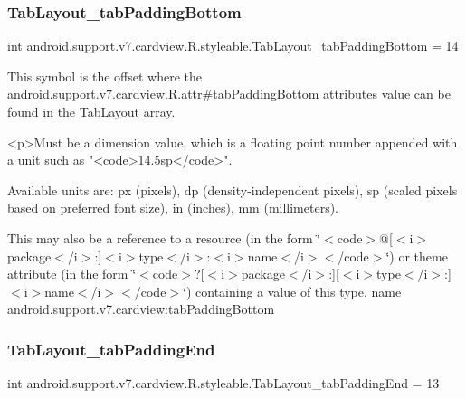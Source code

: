 \subsubsection{\texorpdfstring{Tab\+Layout\+\_\+tab\+Padding\+Bottom}{TabLayout\_tabPaddingBottom}}
{\footnotesize\ttfamily int android.\+support.\+v7.\+cardview.\+R.\+styleable.\+Tab\+Layout\+\_\+tab\+Padding\+Bottom = 14\hspace{0.3cm}{\ttfamily [static]}}

This symbol is the offset where the \hyperlink{classandroid_1_1support_1_1v7_1_1cardview_1_1R_1_1attr_a7133b9a847747e6ce407a36b0d131318}{android.\+support.\+v7.\+cardview.\+R.\+attr\#tab\+Padding\+Bottom} attribute\textquotesingle{}s value can be found in the \hyperlink{classandroid_1_1support_1_1v7_1_1cardview_1_1R_1_1styleable_afa0dc9366603eaec9e38d99273ba8512}{Tab\+Layout} array.

\begin{DoxyVerb}      <p>Must be a dimension value, which is a floating point number appended with a unit such as "<code>14.5sp</code>".
\end{DoxyVerb}
 Available units are\+: px (pixels), dp (density-\/independent pixels), sp (scaled pixels based on preferred font size), in (inches), mm (millimeters). 

This may also be a reference to a resource (in the form \char`\"{}$<$code$>$@\mbox{[}$<$i$>$package$<$/i$>$\+:\mbox{]}$<$i$>$type$<$/i$>$\+:$<$i$>$name$<$/i$>$$<$/code$>$\char`\"{}) or theme attribute (in the form \char`\"{}$<$code$>$?\mbox{[}$<$i$>$package$<$/i$>$\+:\mbox{]}\mbox{[}$<$i$>$type$<$/i$>$\+:\mbox{]}$<$i$>$name$<$/i$>$$<$/code$>$\char`\"{}) containing a value of this type.  name android.\+support.\+v7.\+cardview\+:tab\+Padding\+Bottom \mbox{\label{classandroid_1_1support_1_1v7_1_1cardview_1_1R_1_1styleable_a1ad3770f59bb7fecbbaafe593ca05da6}} 
\subsubsection{\texorpdfstring{Tab\+Layout\+\_\+tab\+Padding\+End}{TabLayout\_tabPaddingEnd}}
{\footnotesize\ttfamily int android.\+support.\+v7.\+cardview.\+R.\+styleable.\+Tab\+Layout\+\_\+tab\+Padding\+End = 13\hspace{0.3cm}{\ttfamily [static]}}

